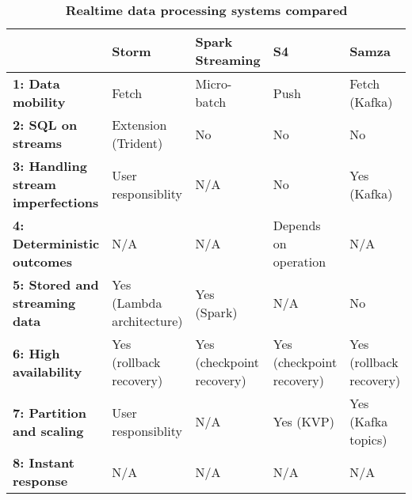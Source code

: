 \begin{landscape}
\begin{table}[H]
\centering
\caption{\textbf{Realtime data processing systems compared}}
\label{tab:processing_systems_compare}

\begin{tabular}{ | l | l | l | l | l | }
\hline
                                                & \textbf{Storm}            & \textbf{Spark Streaming}  & \textbf{S4}               & \textbf{Samza}          \\ \hline
\textbf{1: Data mobility}                       & Fetch                     & Micro-batch               & Push                      & Fetch (Kafka)           \\ \hline
\textbf{2: SQL on streams}                      & Extension (Trident)       & No                        & No                        & No                      \\ \hline
\textbf{3: Handling stream imperfections}    & User responsiblity        & N/A                       & No                        & Yes (Kafka)             \\ \hline
\textbf{4: Deterministic outcomes}              & N/A                       & N/A                       & Depends on operation      & N/A                     \\ \hline
\textbf{5: Stored and streaming data} & Yes (Lambda architecture) & Yes (Spark)               & N/A                       & No                      \\ \hline
\textbf{6: High availability}                   & Yes (rollback recovery)   & Yes (checkpoint recovery) & Yes (checkpoint recovery) & Yes (rollback recovery) \\ \hline
\textbf{7: Partition and scaling}               & User responsiblity        & N/A                       & Yes (KVP)                 & Yes (Kafka topics)      \\ \hline
\textbf{8: Instant response}                    & N/A                       & N/A                       & N/A                       & N/A                     \\ \hline
\end{tabular}
\end{table}
\end{landscape}